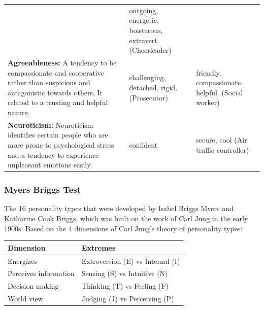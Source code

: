\documentclass[]{book}
\begin{document}
\begin{longtable}[]{@{}lll@{}}
\begin{minipage}[t]{0.28\columnwidth}
\end{minipage} & \begin{minipage}[t]{0.20\columnwidth}\raggedright
outgoing, energetic, boisterous, extravert. (Cheerleader)\strut
\end{minipage}\tabularnewline
\begin{minipage}[t]{0.44\columnwidth}\raggedright
\textbf{Agreeableness:} A tendency to be compassionate and cooperative rather than suspicious and antagonistic towards others. It related to a trusting and helpful nature.\strut
\end{minipage} & \begin{minipage}[t]{0.28\columnwidth}\raggedright
challenging, detached, rigid. (Prosecutor)\strut
\end{minipage} & \begin{minipage}[t]{0.20\columnwidth}\raggedright
friendly, compassionate, helpful. (Social worker)\strut
\end{minipage}\tabularnewline
\begin{minipage}[t]{0.44\columnwidth}\raggedright
\textbf{Neuroticism:} Neuroticism identifies certain people who are more prone to psychological stress and a tendency to experience unpleasant emotions easily.\strut
\end{minipage} & \begin{minipage}[t]{0.28\columnwidth}\raggedright
confident\strut
\end{minipage} & \begin{minipage}[t]{0.20\columnwidth}\raggedright
secure, cool (Air traffic controller)\strut
\end{minipage}\tabularnewline
\bottomrule
\end{longtable}

\hypertarget{myers-briggs-test}{%
\subsubsection{Myers Briggs Test}\label{myers-briggs-test}}

The 16 personality types that were developed by Isabel Briggs Myers and Katharine Cook Briggs, which was built on the work of Carl Jung in the early 1900s. Based on the 4 dimensions of Carl Jung's theory of personality types:

\begin{longtable}[]{@{}ll@{}}
\toprule
Dimension & Extremes\tabularnewline
\midrule
\endhead
Energizes & Extroversion (E) vs Internal (I)\tabularnewline
Perceives information & Sensing (S) vs Intuitive (N)\tabularnewline
Decision making & Thinking (T) vs Feeling (F)\tabularnewline
World view & Judging (J) vs Perceiving (P)\tabularnewline
\bottomrule
\end{longtable}
\end{document}
